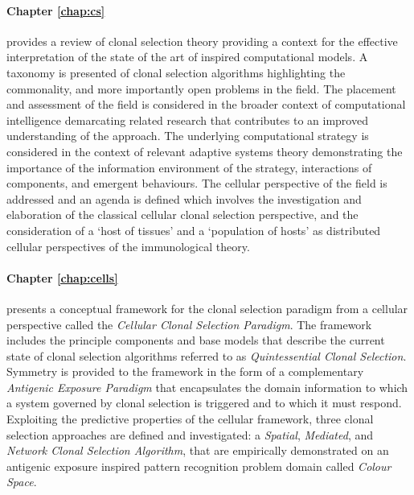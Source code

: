 \paragraph{Chapter \ref{chap:cs}} provides a review of clonal selection theory providing a context for the effective interpretation of the state of the art of inspired computational models. A taxonomy is presented of clonal selection algorithms highlighting the commonality, and more importantly open problems in the field. The placement and assessment of the field is considered in the broader context of computational intelligence demarcating related research that contributes to an improved understanding of the approach. The underlying computational strategy is considered in the context of relevant adaptive systems theory demonstrating the importance of the information environment of the strategy, interactions of components, and emergent behaviours. The cellular perspective of the field is addressed and an agenda is defined which involves the investigation and elaboration of the classical cellular clonal selection perspective, and the consideration of a `host of tissues' and a `population of hosts' as distributed cellular perspectives of the immunological theory.

\paragraph{Chapter \ref{chap:cells}} presents a conceptual framework for the clonal selection paradigm from a cellular perspective called the \emph{Cellular Clonal Selection Paradigm}. The framework includes the principle components and base models that describe the current state of clonal selection algorithms referred to as \emph{Quintessential Clonal Selection}. Symmetry is provided to the framework in the form of a complementary \emph{Antigenic Exposure Paradigm} that encapsulates the domain information to which a system governed by clonal selection is triggered and to which it must respond. Exploiting the predictive properties of the cellular framework, three clonal selection approaches are defined and investigated: a \emph{Spatial}, \emph{Mediated}, and \emph{Network Clonal Selection Algorithm}, that are empirically demonstrated on an antigenic exposure inspired pattern recognition problem domain called \emph{Colour Space}. 
	

